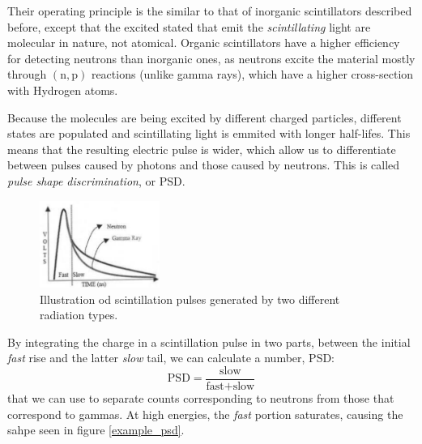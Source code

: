 \documentclass[a4paper,12pt]{report}
\begin{document}
Their operating principle is the similar to that of inorganic scintillators described before, except that the excited stated that emit the \textit{scintillating} light are molecular in nature, not atomical.
Organic scintillators have a higher efficiency for detecting neutrons than inorganic ones, as neutrons excite the material mostly through $\left( \text{n},\text{p}  \right)$ reactions (unlike gamma rays), which have a higher cross-section with Hydrogen atoms.

Because the molecules are being excited by different charged particles, different states are populated and scintillating light is emmited with longer half-lifes.
This means that the resulting electric pulse is wider, which allow us to differentiate between pulses caused by photons and those caused by neutrons.
This is called \textit{pulse shape discrimination}, or PSD.

\begin{figure}[H]
	\centering
	\includegraphics[width=0.35\textwidth]{psd_explanation.png}
	\caption{Illustration od scintillation pulses generated by two different radiation types.}	%
	\label{psd_explanation}
\end{figure}

By integrating the charge in a scintillation pulse in two parts, between the initial \textit{fast} rise and the latter \textit{slow} tail, we can calculate a number, PSD:
\begin{equation}
	\text{PSD} = \frac{\text{slow}}{\text{fast}+\text{slow}}	%
\end{equation}
that we can use to separate counts corresponding to neutrons from those that correspond to gammas.
At high energies, the \textit{fast} portion saturates, causing the sahpe seen in figure \ref{example_psd}.
\end{document}
